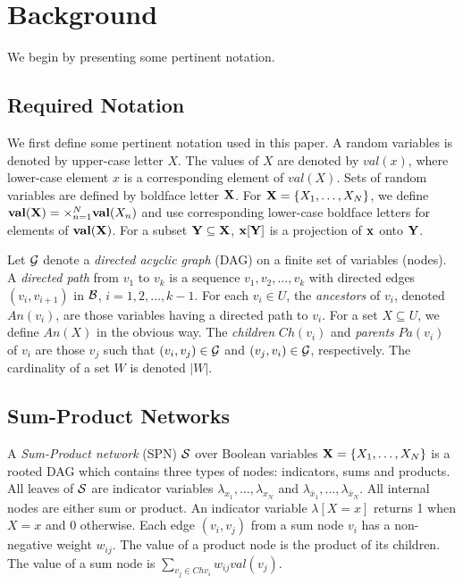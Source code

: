 \section{Background}
\label{sec:back}

We begin by presenting some pertinent notation.

\subsection{Required Notation}

We first define some pertinent notation used in this paper.
A random variables is denoted by upper-case letter $X$.
The values of $X$ are denoted by $val(x)$, where lower-case element $x$ is a corresponding element of $val(X)$.
Sets of random variables are defined by boldface letter ${\bf X}$.
For ${\bf X} = \{X_1,\dots,X_N\}$, we define ${\bf val(X)} = \times^{N}_{n=1}{{\bf val}(X_n)}$ and use corresponding lower-case boldface  letters for elements of ${\bf val(X)}$.
For a subset ${\bf Y \subseteq X}$, ${\bf x[Y]}$ is a projection of ${\bf x}$ onto ${\bf Y}$.

Let ${\cal G}$ denote a \emph{directed acyclic graph} (DAG) on a finite set of variables (nodes).
A \emph{directed path} from $v_1$ to $v_k$ is a sequence $v_1, v_2, \ldots , v_k$ with directed edges $(v_i, v_{i+1})$ in ${\cal B}$, $i = 1, 2,\ldots, k-1$.
For each $v_i \in U$, the \emph{ancestors} of $v_i$, denoted $An(v_i)$, are those variables having a directed path to $v_i$.
For a set $X \subseteq U$, we define $An(X)$ in the obvious way.
The \emph{children} $Ch(v_i)$ and \emph{parents} $Pa(v_i)$ of $v_i$ are those $v_j$ such that $(v_i,v_j) \in {\cal G}$ and $(v_j,v_i) \in {\cal G}$, respectively.
The cardinality of a set $W$ is denoted $|W|$.


\subsection{Sum-Product Networks}

A \emph{Sum-Product network} (SPN) $\cal S$ over Boolean variables ${\bf X} = \{X_1,\dots,X_N\}$ is a rooted DAG which contains three types of nodes: indicators, sums and products.
All leaves of $\cal S$ are indicator variables $\lambda_{x_1},\ldots,\lambda_{x_N}$ and $\lambda_{\bar{x}_1},\ldots,\lambda_{\bar{x}_N}$.
All internal nodes are either sum or product.
An indicator variable $\lambda[X=x]$ returns 1 when $X=x$ and 0 otherwise.
Each edge $(v_i,v_j)$ from a sum node $v_i$ has a non-negative weight $w_{ij}$.
The value of a product node is the product of its children.
The value of a sum node is $\sum_{v_j \in Ch{v_i}}{w_{ij}val(v_j)}$.

